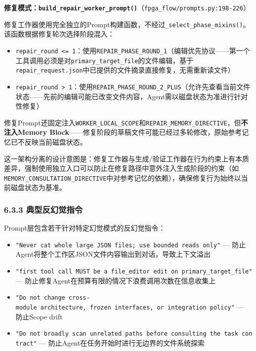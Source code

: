 \textbf{修复模式：\texttt{build\_repair\_worker\_prompt()}}（\texttt{fpga\_flow/prompts.py:198-226}）

修复工作器使用完全独立的Prompt构建函数，不经过\texttt{\_select\_phase\_mixins()}。该函数根据修复轮次选择阶段混入：

\begin{itemize}
\tightlist
\item
  \texttt{repair\_round\ \textless{}=\ 1}：使用\texttt{REPAIR\_PHASE\_ROUND\_1}（编辑优先协议------第一个工具调用必须是对\texttt{primary\_target\_file}的文件编辑，基于\texttt{repair\_request.json}中已提供的文件摘录直接修复，无需重新读文件）
\item
  \texttt{repair\_round\ \textgreater{}\ 1}：使用\texttt{REPAIR\_PHASE\_ROUND\_2\_PLUS}（允许先查看当前文件状态------先前的编辑可能已改变文件内容，Agent需以磁盘状态为准进行针对性修复）
\end{itemize}

修复Prompt还固定注入\texttt{WORKER\_LOCAL\_SCOPE}和\texttt{REPAIR\_MEMORY\_DIRECTIVE}，但\textbf{不注入Memory
Block}------修复阶段的草稿文件可能已经过多轮修改，原始参考记忆已不反映当前磁盘状态。

这一架构分离的设计意图是：修复工作器与生成/验证工作器在行为约束上有本质差异，强制使用独立入口可以防止在修复路径中意外注入生成阶段的约束（如\texttt{MEMORY\_CONSULTATION\_DIRECTIVE}中对参考记忆的依赖），确保修复行为始终以当前磁盘状态为基准。

\subsubsection{6.3.3
典型反幻觉指令}\label{ux5178ux578bux53cdux5e7bux89c9ux6307ux4ee4}

Prompt层包含若干针对特定幻觉模式的反幻觉指令：

\begin{itemize}
\tightlist
\item
  \texttt{"Never\ cat\ whole\ large\ JSON\ files;\ use\ bounded\ reads\ only"}
  --- 防止Agent将整个工作区JSON文件内容输出到对话，导致上下文溢出
\item
  \texttt{"first\ tool\ call\ MUST\ be\ a\ file\_editor\ edit\ on\ primary\_target\_file"}
  --- 防止修复Agent在预算有限的情况下浪费调用次数在信息收集上
\item
  \texttt{"Do\ not\ change\ cross-module\ architecture,\ frozen\ interfaces,\ or\ integration\ policy"}
  --- 防止Scope drift
\item
  \texttt{"Do\ not\ broadly\ scan\ unrelated\ paths\ before\ consulting\ the\ task\ contract"}
  --- 防止Agent在任务开始时进行无边界的文件系统探索
\end{itemize}

